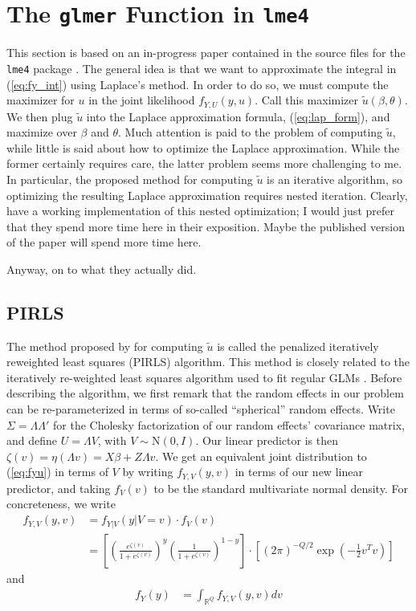 \documentclass{article}
\newcommand{\bR}{\mathbb{R}}
\begin{document}
\section{The \texttt{glmer} Function in \texttt{lme4}}

This section is based on an in-progress paper contained in the source files for the \texttt{lme4} package \citep{Wal24}. The general idea is that we want to approximate the integral in (\ref{eq:fy_int}) using Laplace's method. In order to do so, we must compute the maximizer for $u$ in the joint likelihood $f_{Y,U}(y,u)$. Call this maximizer $\tilde{u}(\beta, \theta)$. We then plug $\tilde{u}$ into the Laplace approximation formula, (\ref{eq:lap_form}), and maximize over $\beta$ and $\theta$. Much attention is paid to the problem of computing $\tilde{u}$, while little is said about how to optimize the Laplace approximation. While the former certainly requires care, the latter problem seems more challenging to me. In particular, the proposed method for computing $\tilde{u}$ is an iterative algorithm, so optimizing the resulting Laplace approximation requires nested iteration. Clearly, \citeauthor{Wal24} have a working implementation of this nested optimization; I would just prefer that they spend more time here in their exposition. Maybe the published version of the paper will spend more time here.

Anyway, on to what they actually did.

\subsection{PIRLS}
\label{sec:PIRLS}

The method proposed by \citet{Wal24} for computing $\tilde{u}$ is called the penalized iteratively reweighted least squares (PIRLS) algorithm. This method is closely related to the iteratively re-weighted least squares algorithm used to fit regular GLMs \citep[see Section 2.5 of ][]{McC89}. Before describing the algorithm, we first remark that the random effects in our problem can be re-parameterized in terms of so-called ``spherical'' random effects. Write $\Sigma = \Lambda \Lambda'$ for the Cholesky factorization of our random effects' covariance matrix, and define $U = \Lambda V$, with $V \sim \mathrm{N}(0, I)$. Our linear predictor is then $\zeta(v) = \eta(\Lambda v) = X \beta + Z \Lambda v$. We get an equivalent joint distribution to (\ref{eq:fyu}) in terms of $V$ by writing $f_{Y,V}(y,v)$ in terms of our new linear predictor, and taking $f_V(v)$ to be the standard multivariate normal density. For concreteness, we write
%
\begin{align}
    f_{Y,V}(y, v) &= f_{Y|V}(y | V=v) \cdot f_V(v)\\
    &= \left[ \left( \frac{e^{\zeta(v)}}{1 + e^{\zeta(v)}} \right)^y \left( \frac{1}{1 + e^{\zeta(v)}} \right)^{1-y} \right] \cdot \left[ (2 \pi)^{-Q/2} \exp \left( - \frac{1}{2} v^T v \right)\right] \label{eq:fyv}
\end{align}
%
and
%
\begin{align}
    f_Y(y) &= \int_{\bR^Q} f_{Y,V}(y,v) dv
\end{align}
\end{document}
